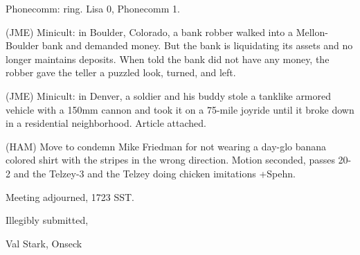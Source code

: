 \documentclass[12pt]{article}
\begin{document}
Phonecomm: ring. Lisa 0, Phonecomm 1.

(JME) Minicult: in Boulder, Colorado, a bank robber walked into a Mellon-Boulder bank and demanded money. But the bank is liquidating its assets and no longer maintains deposits. When told the bank did not have any money, the robber gave the teller a puzzled look, turned, and left.

(JME) Minicult: in Denver, a soldier and his buddy stole a tanklike armored vehicle with a 150mm cannon and took it on a 75-mile joyride until it broke down in a residential neighborhood. Article attached.

(HAM) Move to condemn Mike Friedman for not wearing a day-glo banana colored shirt with the stripes in the wrong direction. Motion seconded, passes 20-2 and the Telzey-3 and the Telzey doing chicken imitations +Spehn.

\vspace{12pt}

\noindent
Meeting adjourned, 1723 SST.

\vspace{18pt}

\centerline{Illegibly submitted,}
\centerline{Val Stark, Onseck}
\end{document}
